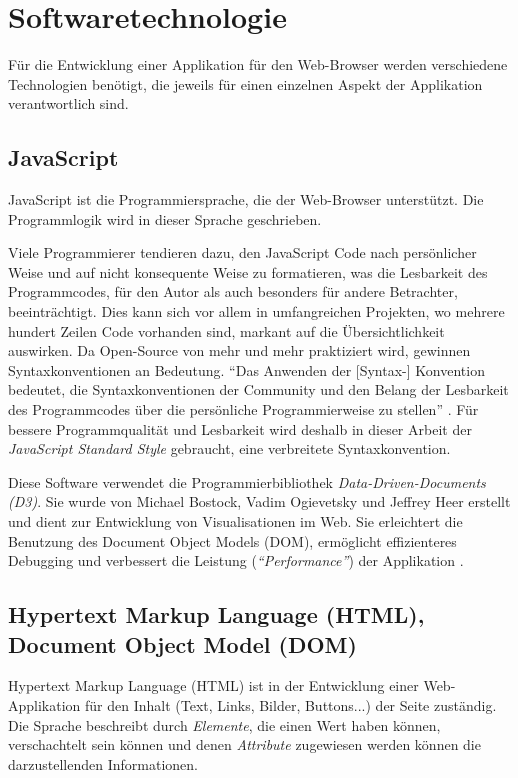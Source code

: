 \section{Softwaretechnologie}

Für die Entwicklung einer Applikation für den Web-Browser werden verschiedene Technologien benötigt, die jeweils für einen einzelnen Aspekt der Applikation verantwortlich sind.

\subsection{JavaScript}

JavaScript ist die Programmiersprache, die der Web-Browser unterstützt. Die Programmlogik wird in dieser Sprache geschrieben.

Viele Programmierer tendieren dazu, den JavaScript Code nach persönlicher Weise und auf nicht konsequente Weise zu formatieren, was die Lesbarkeit des Programmcodes, für den Autor als auch besonders für andere Betrachter, beeinträchtigt. Dies kann sich vor allem in umfangreichen Projekten, wo mehrere hundert Zeilen Code vorhanden sind, markant auf die Übersichtlichkeit auswirken. Da Open-Source von mehr und mehr praktiziert wird, gewinnen Syntaxkonventionen an Bedeutung. "`Das Anwenden der [Syntax-] Konvention bedeutet, die Syntaxkonventionen der Community und den Belang der Lesbarkeit des Programmcodes über die persönliche Programmierweise zu stellen"' \cite{feross}. Für bessere Programmqualität und Lesbarkeit wird deshalb in dieser Arbeit der \textit{JavaScript Standard Style} gebraucht, eine verbreitete Syntaxkonvention.

Diese Software verwendet die Programmierbibliothek \textit{Data-Driven-Documents (D3)}. Sie wurde von Michael Bostock, Vadim Ogievetsky und Jeffrey Heer erstellt und dient zur Entwicklung von Visualisationen im Web. Sie erleichtert die Benutzung des Document Object Models (DOM), ermöglicht effizienteres Debugging und verbessert die Leistung (\textit{"`Performance"'}) der Applikation \cite{bostock}.


\subsection{Hypertext Markup Language (HTML), Document Object Model (DOM)}

Hypertext Markup Language (HTML) ist in der Entwicklung einer Web-Applikation für den Inhalt (Text, Links, Bilder, Buttons...) der Seite zuständig. Die Sprache beschreibt durch \textit{Elemente}, die einen Wert haben können, verschachtelt sein können und denen \textit{Attribute} zugewiesen werden können die darzustellenden Informationen. 

